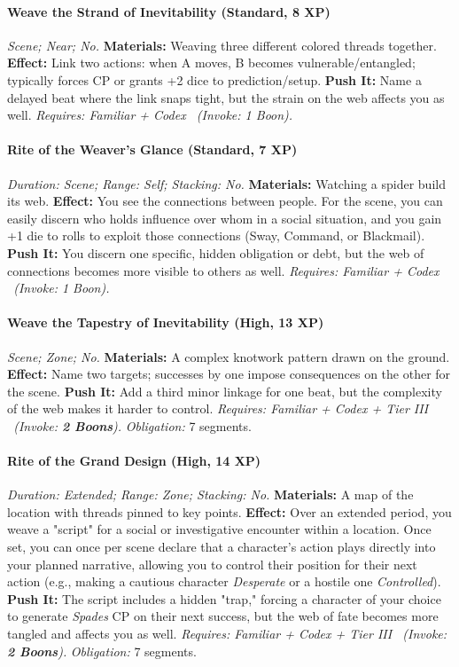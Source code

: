 \documentclass[12pt,twoside]{book}
\begin{document}
\paragraph{Weave the Strand of Inevitability (Standard, 8 XP)} \emph{Scene; Near; No.}
\textbf{Materials:} Weaving three different colored threads together.
\textbf{Effect:} Link two actions: when A moves, B becomes vulnerable/entangled; typically forces CP or grants +2 dice to prediction/setup.
\textbf{Push It:} Name a delayed beat where the link snaps tight, but the strain on the web affects you as well.
\emph{Requires: Familiar + Codex \ (\textit{Invoke:} 1 Boon).}
\paragraph{Rite of the Weaver's Glance (Standard, 7 XP)} \emph{Duration: Scene; Range: Self; Stacking: No.}
\textbf{Materials:} Watching a spider build its web.
\textbf{Effect:} You see the connections between people. For the scene, you can easily discern who holds influence over whom in a social situation, and you gain +1 die to rolls to exploit those connections (Sway, Command, or Blackmail).
\textbf{Push It:} You discern one specific, hidden obligation or debt, but the web of connections becomes more visible to others as well.
\emph{Requires: Familiar + Codex \ (\textit{Invoke:} 1 Boon).}
\paragraph{Weave the Tapestry of Inevitability (High, 13 XP)} \emph{Scene; Zone; No.}
\textbf{Materials:} A complex knotwork pattern drawn on the ground.
\textbf{Effect:} Name two targets; successes by one impose consequences on the other for the scene.
\textbf{Push It:} Add a third minor linkage for one beat, but the complexity of the web makes it harder to control.
\emph{Requires: Familiar + Codex + Tier III \ (\textit{Invoke:} \textbf{2 Boons}).}
\emph{Obligation:} 7 segments.

\paragraph{Rite of the Grand Design (High, 14 XP)} \emph{Duration: Extended; Range: Zone; Stacking: No.}
\textbf{Materials:} A map of the location with threads pinned to key points.
\textbf{Effect:} Over an extended period, you weave a "script" for a social or investigative encounter within a location. Once set, you can once per scene declare that a character's action plays directly into your planned narrative, allowing you to control their position for their next action (e.g., making a cautious character \emph{Desperate} or a hostile one \emph{Controlled}).
\textbf{Push It:} The script includes a hidden "trap," forcing a character of your choice to generate \emph{Spades} CP on their next success, but the web of fate becomes more tangled and affects you as well.
\emph{Requires: Familiar + Codex + Tier III \ (\textit{Invoke:} \textbf{2 Boons}).}
\emph{Obligation:} 7 segments.
\end{document}
